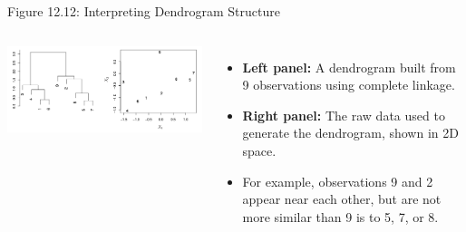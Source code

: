 \documentclass[aspectratio=169,xcolor=dvipsnames]{beamer}
\begin{document}
\begin{frame}{Figure 12.12: Interpreting Dendrogram Structure}
  \begin{columns}
    \includegraphics[width=\linewidth]{images/figure12_12.png} %

    \begin{itemize}
      \item \textbf{Left panel:} A dendrogram built from 9 observations using complete linkage.
      \item \textbf{Right panel:} The raw data used to generate the dendrogram, shown in 2D space.
      \item For example, observations 9 and 2 appear near each other, but are not more similar than 9 is to 5, 7, or 8.
    \end{itemize}
  \end{columns}
\end{frame}
\end{document}
